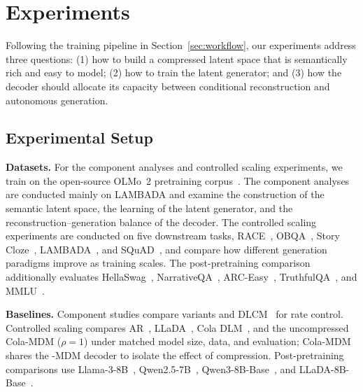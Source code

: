\section{Experiments}
\label{sec:experiments}

\begingroup
\setcounter{topnumber}{2}
\setcounter{totalnumber}{4}
\renewcommand{\topfraction}{0.92}
\renewcommand{\textfraction}{0.06}
\renewcommand{\floatpagefraction}{0.85}
\setlength{\floatsep}{7pt plus 2pt minus 2pt}
\newcommand{\obs}{\refstepcounter{expobs}Obs.~\theexpobs}

Following the training pipeline in Section~\ref{sec:workflow}, our experiments address three questions: (1) how to build a compressed latent space that is semantically rich and easy to model; (2) how to train the latent generator; and (3) how the decoder should allocate its capacity between conditional reconstruction and autonomous generation.

\subsection{Experimental Setup}
\label{subsec:exp-setup}

\textbf{Datasets.} For the component analyses and controlled scaling experiments, we train on the open-source OLMo~2 pretraining corpus~\citep{olmo20242}. The component analyses are conducted mainly on LAMBADA and examine the construction of the semantic latent space, the learning of the latent generator, and the reconstruction--generation balance of the decoder. The controlled scaling experiments are conducted on five downstream tasks, RACE~\citep{lai2017race}, OBQA~\citep{mihaylov2018can}, Story Cloze~\citep{mostafazadeh2016corpus}, LAMBADA~\citep{paperno2016lambada}, and SQuAD~\citep{rajpurkar2016squad}, and compare how different generation paradigms improve as training scales. The post-pretraining comparison additionally evaluates HellaSwag~\citep{zellers2019hellaswag}, NarrativeQA~\citep{kovcisky2018narrativeqa}, ARC-Easy~\citep{clark2018think}, TruthfulQA~\citep{lin2022truthfulqa}, and MMLU~\citep{hendrycks2020measuring}.

\textbf{Baselines.} Component studies compare \method variants and DLCM~\citep{qu2025dynamic} for rate control. Controlled scaling compares AR~\citep{brown2020language}, LLaDA~\citep{nie2026large}, Cola DLM~\citep{guo2026continuous}, and the uncompressed Cola-MDM ($\rho=1$) under matched model size, data, and evaluation; Cola-MDM shares the \method-MDM decoder to isolate the effect of compression. Post-pretraining comparisons use Llama-3-8B~\citep{grattafiori2024llama}, Qwen2.5-7B~\citep{hui2024qwen2}, Qwen3-8B-Base~\citep{yang2025qwen3}, and LLaDA-8B-Base~\citep{nie2026large}.

